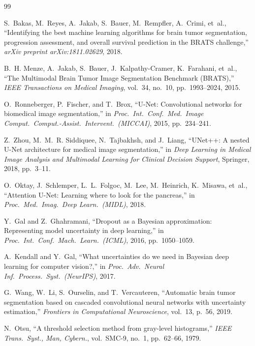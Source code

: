 \documentclass[conference]{IEEEtran}
\begin{document}
\begin{thebibliography}{99}

S.~Bakas, M.~Reyes, A.~Jakab, S.~Bauer, M.~Rempfler, A.~Crimi, et~al.,
``Identifying the best machine learning algorithms for brain tumor
segmentation, progression assessment, and overall survival prediction
in the BRATS challenge,''
\emph{arXiv preprint arXiv:1811.02629}, 2018.

B.~H. Menze, A.~Jakab, S.~Bauer, J.~Kalpathy-Cramer, K.~Farahani, et~al.,
``The Multimodal Brain Tumor Image Segmentation Benchmark (BRATS),''
\emph{IEEE Transactions on Medical Imaging}, vol.~34, no.~10,
pp.~1993--2024, 2015.

O.~Ronneberger, P.~Fischer, and T.~Brox,
``U-Net: Convolutional networks for biomedical image segmentation,''
in \emph{Proc.\ Int.\ Conf.\ Med.\ Image Comput.\ Comput.-Assist.\ Intervent.\ (MICCAI)},
2015, pp.~234--241.

Z.~Zhou, M.~M.~R. Siddiquee, N.~Tajbakhsh, and J.~Liang,
``UNet++: A nested U-Net architecture for medical image segmentation,''
in \emph{Deep Learning in Medical Image Analysis and Multimodal Learning for Clinical Decision Support},
Springer, 2018, pp.~3--11.

O.~Oktay, J.~Schlemper, L.~L.~Folgoc, M.~Lee, M.~Heinrich, K.~Misawa, et~al.,
``Attention U-Net: Learning where to look for the pancreas,''
in \emph{Proc.\ Med.\ Imag.\ Deep Learn.\ (MIDL)}, 2018.

Y.~Gal and Z.~Ghahramani,
``Dropout as a Bayesian approximation: Representing model uncertainty in deep learning,''
in \emph{Proc.\ Int.\ Conf.\ Mach.\ Learn.\ (ICML)}, 2016, pp.~1050--1059.

A.~Kendall and Y.~Gal,
``What uncertainties do we need in Bayesian deep learning for computer vision?,''
in \emph{Proc.\ Adv.\ Neural Inf.\ Process.\ Syst.\ (NeurIPS)}, 2017.

G.~Wang, W.~Li, S.~Ourselin, and T.~Vercauteren,
``Automatic brain tumor segmentation based on cascaded convolutional neural networks with uncertainty estimation,''
\emph{Frontiers in Computational Neuroscience}, vol.~13, p.~56, 2019.

N.~Otsu,
``A threshold selection method from gray-level histograms,''
\emph{IEEE Trans.\ Syst., Man, Cybern.}, vol.~SMC-9, no.~1, pp.~62--66, 1979.


\end{thebibliography}
\end{document}

